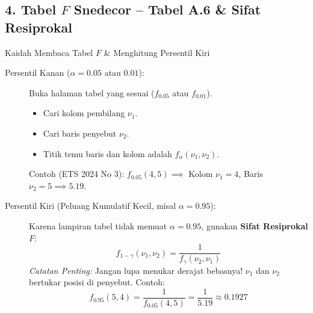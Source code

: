\documentclass[10pt,twoside]{article}
\begin{document}
\subsection{4. Tabel $F$ Snedecor -- Tabel A.6 \& Sifat Resiprokal}
\begin{stepbox}{Kaidah Membaca Tabel $F$ \& Menghitung Persentil Kiri}
\begin{description}
  \item[Persentil Kanan ($\alpha = 0.05$ atau $0.01$):]
  Buka halaman tabel yang sesuai ($f_{0.05}$ atau $f_{0.01}$).
  \begin{itemize}
    \item Cari kolom pembilang $\nu_1$.
    \item Cari baris penyebut $\nu_2$.
    \item Titik temu baris dan kolom adalah $f_\alpha(\nu_1, \nu_2)$.
  \end{itemize}
  Contoh (ETS 2024 No 3): $f_{0.05}(4, 5) \implies$ Kolom $\nu_1 = 4$, Baris $\nu_2 = 5 \implies \mathbf{5.19}$.
  \item[Persentil Kiri (Peluang Kumulatif Kecil, misal $\alpha = 0.95$):]
  Karena lampiran tabel tidak memuat $\alpha = 0.95$, gunakan \textbf{Sifat Resiprokal $F$}:
  \begin{equation*}
    f_{1-\gamma}(\nu_1, \nu_2) = \frac{1}{f_\gamma(\nu_2, \nu_1)}
  \end{equation*}
  \textit{Catatan Penting:} Jangan lupa menukar derajat bebasnya! $\nu_1$ dan $\nu_2$ bertukar posisi di penyebut.
  Contoh:
  \begin{equation*}
    f_{0.95}(5, 4) = \frac{1}{f_{0.05}(4, 5)} = \frac{1}{5.19} \approx \mathbf{0.1927}
  \end{equation*}
\end{description}
\end{stepbox}
\end{document}
